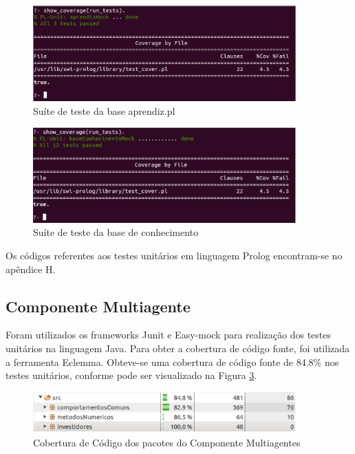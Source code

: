 \begin{figure}[H]
\centering
\includegraphics[width=0.9\textwidth]{figuras/prologTeste1}
\caption{Suíte de teste da base aprendiz.pl}
\label{prologTeste1}
\end{figure}

\begin{figure}[H]
\centering
\includegraphics[width=0.9\textwidth]{figuras/prologTeste2}
\caption{Suíte de teste da base de conhecimento}
\label{prologTeste2}
\end{figure}

Os códigos referentes aos testes unitários em linguagem Prolog encontram-se no apêndice H.

\subsection{Componente Multiagente}
Foram utilizados os frameworks Junit e Easy-mock para realização dos testes unitários na linguagem Java. Para obter a cobertura de código fonte, foi utilizada a ferramenta Eclemma. Obteve-se uma cobertura de código fonte de 84.8\% nos testes unitários, conforme pode ser visualizado na Figura \ref{eclemmaSMA}. 

\begin{figure}[H]
\centering
\includegraphics[width=0.9\textwidth]{figuras/eclemmaSMA}
\caption{Cobertura de Código dos pacotes do Componente Multiagentes}
\label{eclemmaSMA}
\end{figure}

